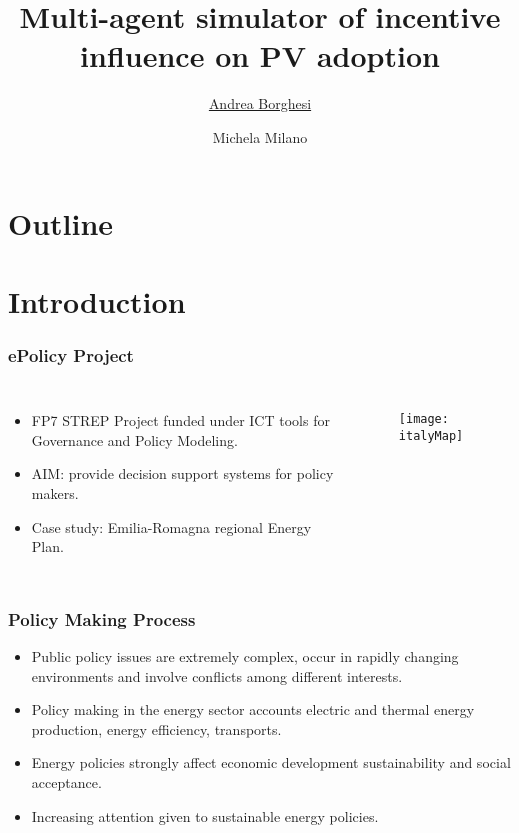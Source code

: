 \documentclass{beamer}
\title{Multi-agent simulator of incentive influence on PV adoption}
\author[]{\underline{Andrea Borghesi} \and  Michela Milano}
\institute[]{DISI, University of Bologna, Italy}
\date{}
\begin{document}
	\begin{frame}[plain]
		\titlepage
	\end{frame}
	

\section*{Outline}
\begin{frame}
	\tableofcontents
\end{frame}


\section{Introduction}

	\begin{frame}
	\frametitle{ePolicy Project}
		\begin{columns}
			\begin{itemize}
				\item FP7 STREP Project funded under ICT tools for Governance and Policy Modeling.
				\item AIM: provide decision support systems for policy makers.
				\item Case study: Emilia-Romagna regional Energy Plan.
			\end{itemize}
			\begin{figure}[hbt]
				\centering
				\texttt{[image: italyMap]}
				\label{italyMap}
			\end{figure}
		\end{columns}
 	\end{frame}
 	
 	\begin{frame}
	\frametitle{Policy Making Process}
		\begin{itemize}
			\item Public policy issues are extremely complex, occur in rapidly changing environments and involve conflicts among different interests.
			\item Policy making in the energy sector accounts electric and thermal energy production, energy efficiency, transports.			
			\item Energy policies strongly affect economic development sustainability and social acceptance.	
 			\item Increasing attention given to sustainable energy policies.
		\end{itemize}
 	\end{frame}
 	
\end{document}
